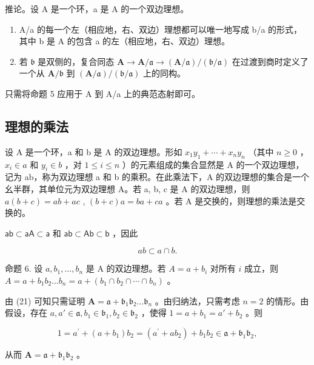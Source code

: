 推论。设 A 是一个环，a 是 A 的一个双边理想。

\begin{enumerate}
\def\labelenumi{(\alph{enumi})}
\item
  A/a 的每一个左（相应地，右、双边）理想都可以唯一地写成 b/a 的形式，其中 b 是 A 的包含 a 的左（相应地，右、双边）理想。
\item
  若 \(\mathfrak{b}\) 是双侧的，复合同态 \(\mathbf{A} \to \mathbf{A} / \mathfrak{a} \to (\mathbf{A} / \mathfrak{a}) / (\mathfrak{b} / \mathfrak{a})\) 在过渡到商时定义了一个从 \(\mathbf{A} / \mathfrak{b}\) 到 \((\mathbf{A} / \mathfrak{a}) / (\mathfrak{b} / \mathfrak{a})\) 上的同构。
\end{enumerate}

只需将命题 5 应用于 A 到 A/a 上的典范态射即可。

\subsection{理想的乘法}

设 A 是一个环，a 和 b 是 A 的双边理想。形如 \(x_{1}y_{1} + \cdots + x_{n}y_{n}\) （其中 \(n \geqslant 0\) ， \(x_{i} \in a\) 和 \(y_{i} \in b\) ，对 \(1 \leqslant i \leqslant n\) ）的元素组成的集合显然是 A 的一个双边理想，记为 ab，称为双边理想 a 和 b 的乘积。在此乘法下，A 的双边理想的集合是一个幺半群，其单位元为双边理想 A。若 a, b, c 是 A 的双边理想，则 \(a(b + c) = ab + ac\) , \((b + c)a = ba + ca\) 。若 A 是交换的，则理想的乘法是交换的。

\(\mathsf{ab}\subset \mathsf{aA}\subset \mathsf{a}\) 和 \(\mathsf{ab}\subset \mathsf{Ab}\subset \mathsf{b}\) ，因此

\[
a b \subset a \cap b.\tag{21}
\]

命题 6. 设 \(a, b_{1}, \ldots, b_{n}\) 是 A 的双边理想。若 \(A = a + b_{i}\) 对所有 \(i\) 成立，则 \(A = a + b_{1}b_{2} \ldots b_{n} = a + (b_{1} \cap b_{2} \cap \cdots \cap b_{n})\) 。

由 (21) 可知只需证明 \(\mathbf{A} = \mathfrak{a} + \mathfrak{b}_1\mathfrak{b}_2\ldots \mathfrak{b}_n\) 。由归纳法，只需考虑 \(n = 2\) 的情形。由假设，存在 \(a, a' \in \mathfrak{a}, b_1 \in \mathfrak{b}_1, b_2 \in \mathfrak{b}_2\) ，使得 \(1 = a + b_1 = a' + b_2\) 。则

\[
1 = a ^ {\prime} + (a + b _ {1}) b _ {2} = \left(a ^ {\prime} + a b _ {2}\right) + b _ {1} b _ {2} \in \mathfrak {a} + \mathfrak {b} _ {1} \mathfrak {b} _ {2},
\]

从而 \(\mathbf{A} = \mathfrak{a} + \mathfrak{b}_1\mathfrak{b}_2\) 。

